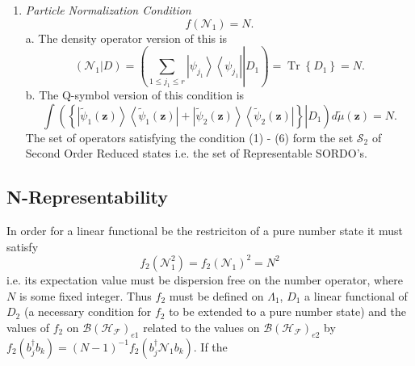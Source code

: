 \documentclass[aps,preprint]{revtex4}%
\begin{document}
\begin{enumerate}
\item \emph{Particle} \emph{Normalization Condition }%
\begin{equation}
f\left(  \mathcal{N}_{1}\right)  =N.
\end{equation}
a. The density operator version of this is
\begin{equation}
\left(  \left.  \mathcal{N}_{1}\right\vert D\right)  =\left(  \left.
\sum_{1\leq j_{1}\leq r}\left\vert \psi_{j_{1}}\right\rangle \left\langle
\psi_{j_{1}}\right\vert \right\vert D_{1}\right)  =\operatorname*{Tr}\left\{
D_{1}\right\}  =N.
\end{equation}
b. The Q-symbol version of this condition is
\begin{equation}
\int\left(  \left.  \left\{  \left\vert \tilde{\psi}_{1}\left(  \mathbf{z}%
\right)  \right\rangle \left\langle \tilde{\psi}_{1}\left(  \mathbf{z}\right)
\right\vert +\left\vert \tilde{\psi}_{2}\left(  \mathbf{z}\right)
\right\rangle \left\langle \tilde{\psi}_{2}\left(  \mathbf{z}\right)
\right\vert \right\}  \right\vert D_{1}\right)  d\tilde{\mu}\left(
\mathbf{z}\right)  =N.
\end{equation}
The set of operators satisfying the condition (1) - (6) form the set
$\mathcal{S}_{2}$ of Second Order Reduced states i.e. the set of Representable SORDO's.
\end{enumerate}

\subsection{N-Representability}

\qquad In order for a linear functional be the restriciton of a pure number
state it must satisfy
\begin{equation}
f_{2}\left(  \mathcal{N}_{1}^{2}\right)  =f_{2}\left(  \mathcal{N}_{1}\right)
^{2}=N^{2}%
\end{equation}
i.e. its expectation value must be dispersion free on the number operator,
where $N$ is some fixed integer. Thus $f_{2}$ must be defined on $\Lambda_{1}%
$, $D_{1}$ a linear functional of $D_{2}$ (a necessary condition for $f_{2}$
to be extended to a pure number state) and the values of $f_{2}$ on
$\mathcal{B}\left(  \mathcal{H}_{\mathcal{F}}\right)  _{e1}$ related to the
values on $\mathcal{B}\left(  \mathcal{H}_{\mathcal{F}}\right)  _{e2}$ by
$f_{2}\left(  b_{j}^{\dagger}b_{k}\right)  =\left(  N-1\right)  ^{-1}%
f_{2}\left(  b_{j}^{\dagger}\mathcal{N}_{1}b_{k}\right)  .$ If the
\end{document}
